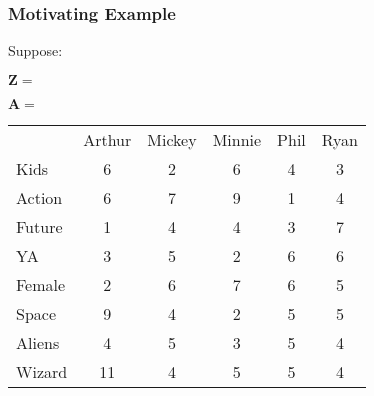 \documentclass{beamer}
\def\wl{\par \vspace{\baselineskip}}
\begin{document}
  \begin{frame}
  \frametitle{Motivating Example}
      Suppose:
        \wl
        $\bm Z =$
        \begin{table}
       \end{table}
       \wl
       $\bm A =$
       \begin{table}
       \tiny{%
         \begin{tabular}{l|c|c|c|c|c|}
           \multicolumn{1}{c}{}
             & \multicolumn{1}{c}{Arthur} 
             & \multicolumn{1}{c}{Mickey}
             & \multicolumn{1}{c}{Minnie}
             & \multicolumn{1}{c}{Phil}
             & \multicolumn{1}{c}{Ryan} \\ 
           \cline{2-6}

           Kids   & 6&2&6&4&3\\ \cline{2-6}
           Action & 6&7&9&1&4\\ \cline{2-6}
           Future & 1&4&4&3&7\\ \cline{2-6}
           YA     & 3&5&2&6&6\\ \cline{2-6}
           Female & 2&6&7&6&5\\ \cline{2-6}
           Space  & 9&4&2&5&5\\ \cline{2-6}
           Aliens & 4&5&3&5&4\\ \cline{2-6}
           Wizard &11&4&5&5&4\\ \cline{2-6}
         \end{tabular}%
       }  
      \end{table} 
  \end{frame}
\end{document}
